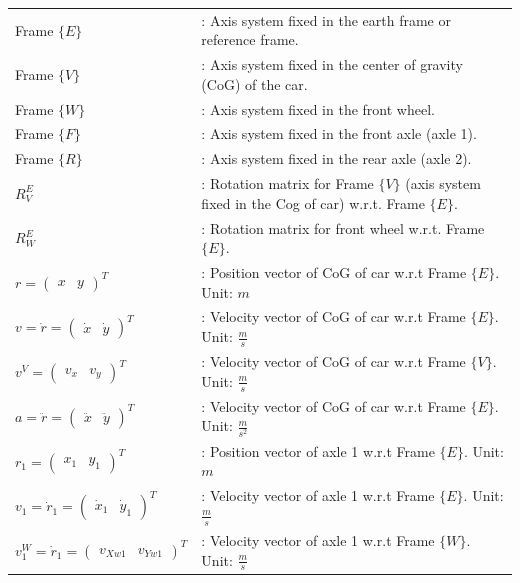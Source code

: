 \documentclass[12pt]{article}
\begin{document}
\begin{table}[H]
\begin{tabular}{p{4cm} p{10cm}}
Frame $\{ E \}$& : Axis system fixed in the earth frame or reference frame.\\
Frame $\{ V \}$& : Axis system fixed in the center of gravity (CoG) of the car.\\
Frame $\{ W \}$& : Axis system fixed in the front wheel.\\
Frame $\{ F \}$& : Axis system fixed in the front axle (axle 1).\\
Frame $\{ R \}$& : Axis system fixed in the rear axle (axle 2).\\
$R^E_V$ & : Rotation matrix for Frame $\{ V \}$  (axis system fixed in the Cog of car) w.r.t. Frame $\{E\}$.\\
$R^E_W$ & : Rotation matrix for front wheel w.r.t. Frame $\{E\}$.\\
$r = \begin{pmatrix} x & y \end{pmatrix}^T$ & : Position vector of CoG of car w.r.t Frame $ \{ E \}$. Unit: $m$\\
$v = \dot{r} = \begin{pmatrix} \dot{x} & \dot{y} \end{pmatrix}^T$ & : Velocity vector of CoG of car w.r.t Frame $ \{ E \}$. Unit: $ \displaystyle \frac{m}{s}$\\
$v^V = \begin{pmatrix} v_x & v_y \end{pmatrix}^T$ & : Velocity vector of CoG of car w.r.t Frame $ \{ V \}$. Unit: $ \displaystyle \frac{m}{s}$\\
$a = \ddot{r} = \begin{pmatrix} \ddot{x} & \ddot{y} \end{pmatrix}^T$ & : Velocity vector of CoG of car w.r.t Frame $ \{ E \}$. Unit: $ \displaystyle \frac{m}{s^2}$\\
$r_1 = \begin{pmatrix} x_1 & y_1 \end{pmatrix}^T$ & : Position vector of axle 1 w.r.t Frame $ \{ E \}$. Unit: $m$\\
$v_1 = \dot{r}_1 = \begin{pmatrix} \dot{x}_1 & \dot{y}_1 \end{pmatrix}^T$ & : Velocity vector of axle 1 w.r.t Frame $ \{ E \}$. Unit: $ \displaystyle \frac{m}{s}$\\
$v^W_1 = \dot{r}_1 = \begin{pmatrix} v_{Xw1} & v_{Yw1} \end{pmatrix}^T$ & : Velocity vector of axle 1 w.r.t Frame $ \{ W \}$. Unit: $ \displaystyle \frac{m}{s}$\\

\end{tabular}
\end{table}
\end{document}

